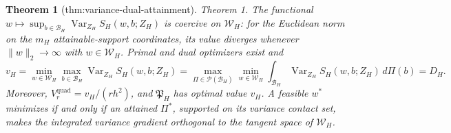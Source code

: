 \documentclass{article}
\newtheorem{theorem}{Theorem}
\begin{document}
\begin{theorem}[thm:variance-dual-attainment]\label{thm:variance-dual-attainment}
Theorem 1. The functional \(w\mapsto\sup_{b\in\mathcal B_H}\operatorname{Var}_{Z_H}S_H(w,b;Z_H)\) is coercive on \(\mathcal W_H\): for the Euclidean norm on the \(m_H\) attainable-support coordinates, its value diverges whenever \(\|w\|_2\to\infty\) with \(w\in\mathcal W_H\). Primal and dual optimizers exist and \[v_H=\min_{w\in\mathcal W_H}\max_{b\in\mathcal B_H}\operatorname{Var}_{Z_H}S_H(w,b;Z_H)=\max_{\Pi\in\mathcal P(\mathcal B_H)}\min_{w\in\mathcal W_H}\int_{\mathcal B_H}\operatorname{Var}_{Z_H}S_H(w,b;Z_H)\,d\Pi(b)=D_H.\] Moreover, \(V^{\mathrm{quad}}_r=v_H/(rh^2)\), and \(\mathfrak P_H\) has optimal value \(v_H\). A feasible \(w^*\) minimizes if and only if an attained \(\Pi^*\), supported on its variance contact set, makes the integrated variance gradient orthogonal to the tangent space of \(\mathcal W_H\).
\end{theorem}
\end{document}
